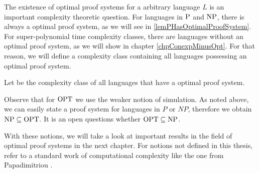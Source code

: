   The existence of optimal proof systems for a arbitrary language \(L\) is an important complexity theoretic question. For languages in \(\P\) and \(\NP\), there is always a optimal proof system, as we will see in \ref{lemPHasOptimalProofSystem}. For super-polynomial time complexity classes, there are languages without an optimal proof system, as we will show in chapter \ref{chpConexpMinusOpt}. For that reason, we will define a complexity class containing all languages possessing an optimal proof system.

  \begin{definition}
    Let  be the complexity class of all languages that have a optimal proof system.
  \end{definition}

  Observe that for \(\OPT\) we use the weaker notion of simulation. As noted above, we can easily state a proof system for languages in \(P\) or \(NP\), therefore we obtain \(\NP \subseteq \OPT\). It is an open questions whether \(\OPT \subseteq \NP\).  

  With these notions, we will take a look at important results in the field of optimal proof systems in the next chapter. For notions not defined in this thesis, refer to a standard work of computational complexity like the one from Papadimitriou \cite{Pap94}.

